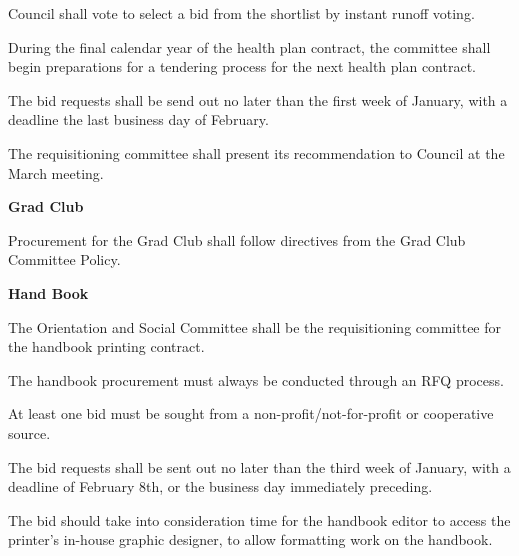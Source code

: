 \begin{longenum}[label*=\thesection.\arabic*., align=left]
\begin{longenum} [label*=\arabic*., align=left]
\begin{longenum} [label*=\arabic*., align=left]
		\item Council shall vote to select a bid from the shortlist by instant runoff voting.
			
		\item 	During the final calendar year of the health plan contract, the committee shall begin preparations for a tendering process for the next health plan contract.
			
		\item 	The bid requests shall be send out no later than the first week of January, with a deadline the last business day of February.
			
		\item 	The requisitioning committee shall present its recommendation to Council at the March meeting. 
			
	\end{longenum}	
\item \textbf{Grad Club}
\begin{longenum} [label*=\arabic*., align=left]
	\item Procurement for the Grad Club shall follow directives from the Grad Club Committee Policy.
\end{longenum}	
\item \textbf{Hand Book}
\begin{longenum} [label*=\arabic*., align=left]
	\item The Orientation and Social Committee shall be the requisitioning committee for the handbook printing contract.
	
	\item The handbook procurement must always be conducted through an RFQ process.
	
	\item At least one bid must be sought from a non-profit/not-for-profit or cooperative source.
	
	\item The bid requests shall be sent out no later than the third week of January, with a deadline of February 8th, or the business day immediately preceding.
	
	\item The bid should take into consideration time for the handbook editor to access the printer's in-house graphic designer, to allow formatting work on the handbook.
\end{longenum}
\end{longenum}

\end{longenum}
